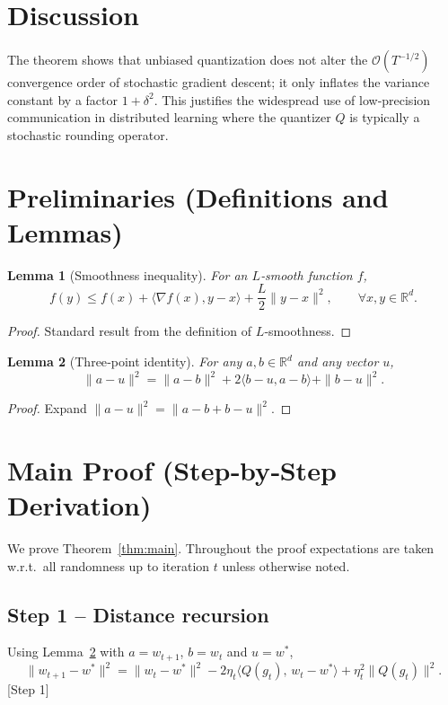 \documentclass{article}
\newtheorem{lemma}{Lemma}
\newcommand{\R}{\mathbb{R}}
\begin{document}
\section*{Discussion}
The theorem shows that unbiased quantization does not alter the $\mathcal{O}(T^{-1/2})$ convergence order of stochastic gradient descent; it only inflates the variance constant by a factor $1+\delta^{2}$. This justifies the widespread use of low‑precision communication in distributed learning where the quantizer $Q$ is typically a stochastic rounding operator.

\section*{Preliminaries (Definitions and Lemmas)}
\begin{lemma}[Smoothness inequality]\label{lem:smooth}
For an $L$‑smooth function $f$,
\[
f(y)\le f(x)+\langle\nabla f(x),y-x\rangle+\frac{L}{2}\|y-x\|^{2},
\qquad\forall x,y\in\R^{d}.
\]
\end{lemma}
\begin{proof}
Standard result from the definition of $L$‑smoothness. \qedhere
\end{proof}

\begin{lemma}[Three‑point identity]\label{lem:three}
For any $a,b\in\R^{d}$ and any vector $u$,
\[
\|a-u\|^{2}= \|a-b\|^{2}+2\langle b-u,a-b\rangle+\|b-u\|^{2}.
\]
\end{lemma}
\begin{proof}
Expand $\|a-u\|^{2}=\|a-b+b-u\|^{2}$. \qedhere
\end{proof}

\section*{Main Proof (Step‑by‑Step Derivation)}
We prove Theorem~\ref{thm:main}. Throughout the proof expectations are taken w.r.t.\ all randomness up to iteration $t$ unless otherwise noted.

\subsection*{Step 1 – Distance recursion}
Using Lemma~\ref{lem:three} with $a=w_{t+1}$, $b=w_{t}$ and $u=w^{*}$,
\[
\|w_{t+1}-w^{*}\|^{2}
= \|w_{t}-w^{*}\|^{2}
-2\eta_t\langle Q(g_t),\,w_{t}-w^{*}\rangle
+\eta_t^{2}\|Q(g_t)\|^{2}. \tag{4}
\]
[Step 1]
\end{document}
